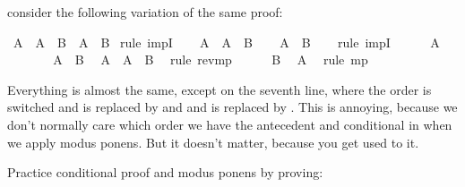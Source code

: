 \begin{isabellebody}
\begin{isamarkuptext}
consider the following variation of the same proof:%
\end{isamarkuptext}\isamarkuptrue%
\isamarkupfalse%
\ {\isachardoublequoteopen}{\isacharparenleft}A\ {\isasymlongrightarrow}\ A\ {\isasymlongrightarrow}\ B{\isacharparenright}\ {\isasymlongrightarrow}\ {\isacharparenleft}A\ {\isasymlongrightarrow}\ B{\isacharparenright}{\isachardoublequoteclose}\isanewline
%
\isadelimproof
%
\endisadelimproof
%
\isatagproof
{}\isamarkupfalse%
\ {\isacharparenleft}rule\ impI{\isacharparenright}\isanewline
\ \ \isamarkupfalse%
\ {\isachardoublequoteopen}A\ {\isasymlongrightarrow}\ A\ {\isasymlongrightarrow}\ B{\isachardoublequoteclose}\isanewline
\ \ \isamarkupfalse%
\ {\isachardoublequoteopen}A\ {\isasymlongrightarrow}\ B{\isachardoublequoteclose}\isanewline
\ \ \isamarkupfalse%
\ {\isacharparenleft}rule\ impI{\isacharparenright}\isanewline
\ \ \ \ \isamarkupfalse%
\ {\isachardoublequoteopen}A{\isachardoublequoteclose}\isanewline
\ \ \ \ \isamarkupfalse%
\ \isamarkupfalse%
\ {\isachardoublequoteopen}A\ {\isasymlongrightarrow}\ B{\isachardoublequoteclose}\ \isamarkupfalse%
\ {\isacharbackquoteopen}A\ {\isasymlongrightarrow}\ A\ {\isasymlongrightarrow}\ B{\isacharbackquoteclose}\ \isamarkupfalse%
\ {\isacharparenleft}rule\ rev{\isacharunderscore}mp{\isacharparenright}\isanewline
\ \ \ \ \isamarkupfalse%
\ {\isachardoublequoteopen}B{\isachardoublequoteclose}\ \isamarkupfalse%
\ {\isacharbackquoteopen}A{\isacharbackquoteclose}\ \isamarkupfalse%
\ {\isacharparenleft}rule\ mp{\isacharparenright}\isanewline
\ \ \isamarkupfalse%
\isanewline
{}\isamarkupfalse%
%
\endisatagproof
{\isafoldproof}%
%
\isadelimproof
%
\endisadelimproof
%
\begin{isamarkuptext}%
Everything is almost the same, except on the seventh line, where the order is switched and
 is replaced by  and  and  is replaced by .
This is annoying, because we don't normally care which order we have the antecedent and conditional
in when we apply modus ponens. But it doesn't matter, because you get used to it.%
\end{isamarkuptext}\isamarkuptrue%
%
\begin{isamarkuptext}%
\begin{Exercise} Practice conditional proof and modus ponens by proving: \end{Exercise}%

\end{isamarkuptext}
\end{isabellebody}
